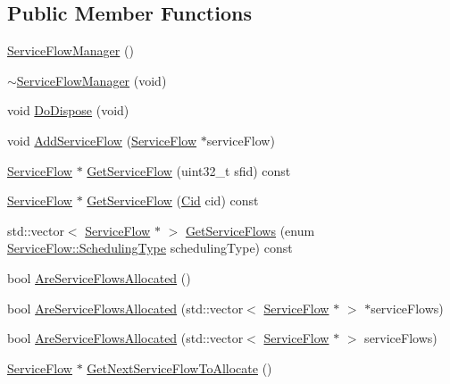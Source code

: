 \subsection*{Public Member Functions}
\begin{DoxyCompactItemize}
\item 
\hyperlink{classns3_1_1ServiceFlowManager_a78a4c85fb73a9ff0c384bbd28b44b5d0}{Service\+Flow\+Manager} ()
\item 
\hyperlink{classns3_1_1ServiceFlowManager_a8fdf51ea2eab4398efb19be90fc20d98}{$\sim$\+Service\+Flow\+Manager} (void)
\item 
void \hyperlink{classns3_1_1ServiceFlowManager_acb8511926dd8ca0ab15c9fcffd4652e6}{Do\+Dispose} (void)
\item 
void \hyperlink{classns3_1_1ServiceFlowManager_a0a891935b94be6fcd17690801271c38d}{Add\+Service\+Flow} (\hyperlink{classns3_1_1ServiceFlow}{Service\+Flow} $\ast$service\+Flow)
\item 
\hyperlink{classns3_1_1ServiceFlow}{Service\+Flow} $\ast$ \hyperlink{classns3_1_1ServiceFlowManager_ae99d01afa5c232e1a8d0f707811eff24}{Get\+Service\+Flow} (uint32\+\_\+t sfid) const 
\item 
\hyperlink{classns3_1_1ServiceFlow}{Service\+Flow} $\ast$ \hyperlink{classns3_1_1ServiceFlowManager_a68cc5914c5dab710f989cedc8aa69051}{Get\+Service\+Flow} (\hyperlink{classns3_1_1Cid}{Cid} cid) const 
\item 
std\+::vector$<$ \hyperlink{classns3_1_1ServiceFlow}{Service\+Flow} $\ast$ $>$ \hyperlink{classns3_1_1ServiceFlowManager_adce26cf358c78252248f0bfab7032cee}{Get\+Service\+Flows} (enum \hyperlink{classns3_1_1ServiceFlow_a7990ba10be1e098328fd1e6382a26235}{Service\+Flow\+::\+Scheduling\+Type} scheduling\+Type) const 
\item 
bool \hyperlink{classns3_1_1ServiceFlowManager_a9338182ed1860eb7e07ea49d79c4414a}{Are\+Service\+Flows\+Allocated} ()
\item 
bool \hyperlink{classns3_1_1ServiceFlowManager_ac403a21cdd60e522068126f199c685aa}{Are\+Service\+Flows\+Allocated} (std\+::vector$<$ \hyperlink{classns3_1_1ServiceFlow}{Service\+Flow} $\ast$ $>$ $\ast$service\+Flows)
\item 
bool \hyperlink{classns3_1_1ServiceFlowManager_a379874dc4abb5a5dab5e0b959df25f94}{Are\+Service\+Flows\+Allocated} (std\+::vector$<$ \hyperlink{classns3_1_1ServiceFlow}{Service\+Flow} $\ast$ $>$ service\+Flows)
\item 
\hyperlink{classns3_1_1ServiceFlow}{Service\+Flow} $\ast$ \hyperlink{classns3_1_1ServiceFlowManager_a04998861e0e480a68318a943aa9cd9c0}{Get\+Next\+Service\+Flow\+To\+Allocate} ()

\end{DoxyCompactItemize}

